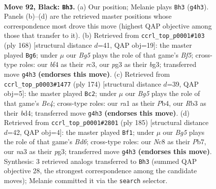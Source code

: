 \documentclass[11pt]{article}
\begin{document}
\clearpage

\begin{figure}[p]\centering
\begin{subfigure}{0.46\textwidth}\centering
\resizebox{\linewidth}{!}{%
\newchessgame
\chessboard[
  setfen={2n1k2K/2P5/p7/P4p1p/5Bb1/Nr2p1P1/8/R7 b - - 3 92},
  showmover=false,
  pgfstyle=straightmove, color=movearrow, markmove={g4-h3}
]}
\caption{}
\end{subfigure}\hfill
\begin{subfigure}{0.46\textwidth}\centering
\resizebox{\linewidth}{!}{%
\newchessgame
\chessboard[
  setfen={8/4k3/5p2/pR3B1p/P3P2P/1Pr3b1/8/5K2 w - - 5 85},
  showmover=false,
  pgfstyle=straightmove, color=movearrow, markmove={f5-g6}
]}
\caption{}
\end{subfigure}
\\[4pt]
\begin{subfigure}{0.46\textwidth}\centering
\resizebox{\linewidth}{!}{%
\newchessgame
\chessboard[
  setfen={2k5/8/3p1p2/1P1P1Pp1/1P1bB1P1/8/Kp6/8 w - - 0 88},
  showmover=false,
  pgfstyle=straightmove, color=movearrow, markmove={e4-c2}
]}
\caption{}
\end{subfigure}\hfill
\begin{subfigure}{0.46\textwidth}\centering
\resizebox{\linewidth}{!}{%
\newchessgame
\chessboard[
  setfen={1B6/1p6/4k1p1/P1K1P2p/2p5/2Pb2P1/7P/8 b - - 74 93},
  showmover=false,
  pgfstyle=straightmove, color=movearrow, markmove={d3-f1}
]}
\caption{}
\end{subfigure}
\caption{\textbf{Move 92, Black: \texttt{Bh3}.} (a) Our position; Melanie plays \texttt{Bh3} (\texttt{g4h3}). Panels (b)--(d) are the retrieved master positions whose correspondence most drove this move (highest QAP objective among those that transfer to it). (b) Retrieved from \texttt{ccrl\_top\_p0001\#103} (ply 168) [structural distance $d$=41, QAP obj=19]: the master played \texttt{Bg6}; under $\mu$ our \emph{Bg5} plays the role of that game's \emph{Bf5}; cross-type roles: our \emph{b}f4 as their \emph{r}c3, our \emph{p}g3 as their \emph{b}g3; transferred move \texttt{g4h3} \textbf{(endorses this move)}. (c) Retrieved from \texttt{ccrl\_top\_p0003\#1477} (ply 174) [structural distance $d$=39, QAP obj=5]: the master played \texttt{Bc2}; under $\mu$ our \emph{Bg5} plays the role of that game's \emph{Be4}; cross-type roles: our \emph{r}a1 as their \emph{P}b4, our \emph{R}b3 as their \emph{b}d4; transferred move \texttt{g4h3} \textbf{(endorses this move)}. (d) Retrieved from \texttt{ccrl\_top\_p0001\#2801} (ply 185) [structural distance $d$=42, QAP obj=4]: the master played \texttt{Bf1}; under $\mu$ our \emph{Bg5} plays the role of that game's \emph{Bd6}; cross-type roles: our \emph{N}c8 as their \emph{P}b7, our \emph{n}a3 as their \emph{p}g3; transferred move \texttt{g4h3} \textbf{(endorses this move)}. Synthesis: 3 retrieved analogs transferred to \texttt{Bh3} (summed QAP objective 28, the strongest correspondence among the candidate moves); Melanie committed it via the \texttt{search} selector.}
\label{fig:thought-m183}
\end{figure}
\end{document}
